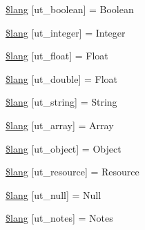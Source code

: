 \begin{DoxyCompactItemize}
\item 
\hyperlink{system_2language_2english_2unit__test__lang_8php_aa274bf9371c9922bc530135b4dc45943}{\$lang} \mbox{[}\textquotesingle{}ut\+\_\+boolean\textquotesingle{}\mbox{]} = \textquotesingle{}Boolean\textquotesingle{}
\item 
\hyperlink{system_2language_2english_2unit__test__lang_8php_aa59dea4a9af41fde66d69436eadfd67b}{\$lang} \mbox{[}\textquotesingle{}ut\+\_\+integer\textquotesingle{}\mbox{]} = \textquotesingle{}Integer\textquotesingle{}
\item 
\hyperlink{system_2language_2english_2unit__test__lang_8php_a0f8267057369911f12753bdef18154cf}{\$lang} \mbox{[}\textquotesingle{}ut\+\_\+float\textquotesingle{}\mbox{]} = \textquotesingle{}Float\textquotesingle{}
\item 
\hyperlink{system_2language_2english_2unit__test__lang_8php_a4c75bfa3ef771d6952b724b23d752b8e}{\$lang} \mbox{[}\textquotesingle{}ut\+\_\+double\textquotesingle{}\mbox{]} = \textquotesingle{}Float\textquotesingle{}
\item 
\hyperlink{system_2language_2english_2unit__test__lang_8php_ab5097b676a29051de6c07955d59659d1}{\$lang} \mbox{[}\textquotesingle{}ut\+\_\+string\textquotesingle{}\mbox{]} = \textquotesingle{}String\textquotesingle{}
\item 
\hyperlink{system_2language_2english_2unit__test__lang_8php_a3d6aa3d4ed503f15adc21813a9018950}{\$lang} \mbox{[}\textquotesingle{}ut\+\_\+array\textquotesingle{}\mbox{]} = \textquotesingle{}Array\textquotesingle{}
\item 
\hyperlink{system_2language_2english_2unit__test__lang_8php_a771c29e5029c601b1f3e7c4e6fb93c94}{\$lang} \mbox{[}\textquotesingle{}ut\+\_\+object\textquotesingle{}\mbox{]} = \textquotesingle{}Object\textquotesingle{}
\item 
\hyperlink{system_2language_2english_2unit__test__lang_8php_a6653a67c4fc0bc5ade6aaf327eed05bf}{\$lang} \mbox{[}\textquotesingle{}ut\+\_\+resource\textquotesingle{}\mbox{]} = \textquotesingle{}Resource\textquotesingle{}
\item 
\hyperlink{system_2language_2english_2unit__test__lang_8php_ad4aef71cf1e43fa884add4613da590cb}{\$lang} \mbox{[}\textquotesingle{}ut\+\_\+null\textquotesingle{}\mbox{]} = \textquotesingle{}Null\textquotesingle{}
\item 
\hyperlink{system_2language_2english_2unit__test__lang_8php_a4d80b77ed0c51d05d5abdc88afa1b540}{\$lang} \mbox{[}\textquotesingle{}ut\+\_\+notes\textquotesingle{}\mbox{]} = \textquotesingle{}Notes\textquotesingle{}
\end{DoxyCompactItemize}


